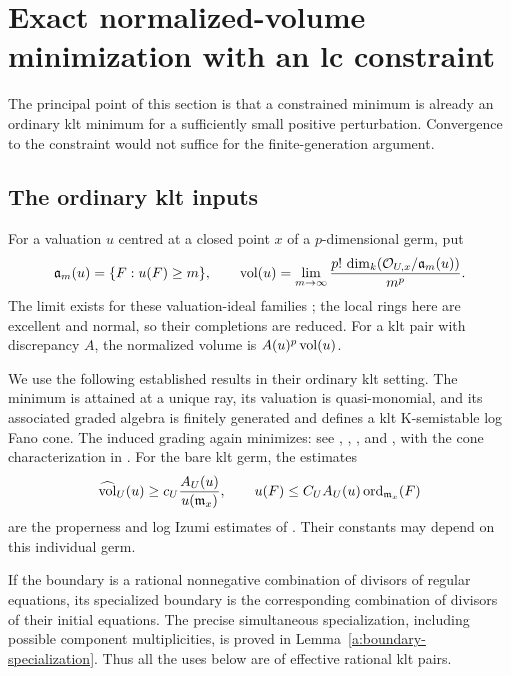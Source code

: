 \section{Exact normalized-volume minimization with an lc constraint}
\label{a:minimum}

The principal point of this section is that a constrained minimum is
already an ordinary klt minimum for a sufficiently small positive
perturbation. Convergence to the constraint would not suffice for the
finite-generation argument.

\subsection{The ordinary klt inputs}

For a valuation \(u\) centred at a closed point \(x\) of a
\(p\)-dimensional germ, put
\[
 \mathfrak a_m(u)=\{F:u(F)\geq m\},\qquad
 \operatorname{vol}(u)=\lim_{m\to\infty}
       \frac{p!\,\dim_k(\mathcal O_{U,x}/\mathfrak a_m(u))}{m^p}.
\]
The limit exists for these valuation-ideal families
\cite[Theorem~1.1 and Corollary~5.6]{CutkoskyVolumes}; the local rings
here are excellent and normal, so their completions are reduced.
For a klt pair with discrepancy \(A\), the normalized volume is
\(A(u)^p\operatorname{vol}(u)\).

We use the following established results in their ordinary klt setting.
The minimum is attained at a unique ray, its valuation is quasi-monomial,
and its associated graded algebra is finitely generated and defines a
klt K-semistable log Fano cone. The induced grading again minimizes:
see \cite[Main Theorem and Section~7.3]{BlumExistence},
\cite[Theorem~1.2 and Remark~3.8]{XuQuasimonomial},
\cite[Theorem~1.1]{XuZhuangUniqueness}, and
\cite[Theorems~1.1--1.2]{XuZhuangStable}, with the cone
characterization in \cite[Theorem~3.5]{LiXuStable}.
For the bare klt germ, the estimates
\[
 \widehat{\operatorname{vol}}_U(u)\geq c_U\frac{A_U(u)}{u(\mathfrak m_x)},\qquad
 u(F)\leq C_U A_U(u)\operatorname{ord}_{\mathfrak m_x}(F)
\]
are the properness and log Izumi estimates of
\cite[Theorems~1.1--1.2]{LiProperness}.
Their constants may depend on this individual germ.

If the boundary is a rational nonnegative combination of divisors of
regular equations, its specialized boundary is the corresponding
combination of divisors of their initial equations.
The precise simultaneous specialization, including possible component
multiplicities, is proved in Lemma~\ref{a:boundary-specialization}.
Thus all the uses below are of effective rational klt pairs.

